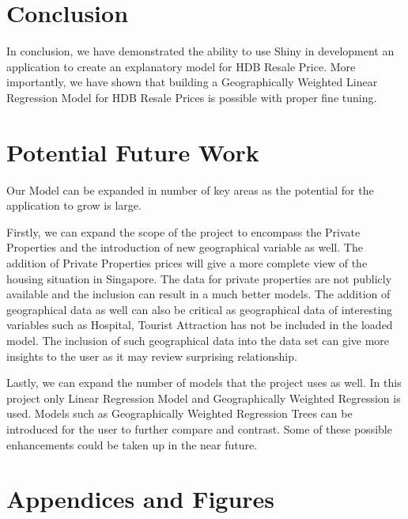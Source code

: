 \documentclass[manuscript,screen]{acmart}
\begin{document}
\hypertarget{conclusion}{%
\section{\texorpdfstring{\textbf{Conclusion}}{Conclusion}}\label{conclusion}}

In conclusion, we have demonstrated the ability to use Shiny in
development an application to create an explanatory model for HDB Resale
Price. More importantly, we have shown that building a Geographically
Weighted Linear Regression Model for HDB Resale Prices is possible with
proper fine tuning.

\hypertarget{potential-future-work}{%
\section{\texorpdfstring{\textbf{Potential Future
Work}}{Potential Future Work}}\label{potential-future-work}}

Our Model can be expanded in number of key areas as the potential for
the application to grow is large.

Firstly, we can expand the scope of the project to encompass the Private
Properties and the introduction of new geographical variable as well.
The addition of Private Properties prices will give a more complete view
of the housing situation in Singapore. The data for private properties
are not publicly available and the inclusion can result in a much better
models. The addition of geographical data as well can also be critical
as geographical data of interesting variables such as Hospital, Tourist
Attraction has not be included in the loaded model. The inclusion of
such geographical data into the data set can give more insights to the
user as it may review surprising relationship.

Lastly, we can expand the number of models that the project uses as
well. In this project only Linear Regression Model and Geographically
Weighted Regression is used. Models such as Geographically Weighted
Regression Trees can be introduced for the user to further compare and
contrast. Some of these possible enhancements could be taken up in the
near future.

\hypertarget{appendices-and-figures}{%
\section{Appendices and Figures}\label{appendices-and-figures}}
\end{document}
